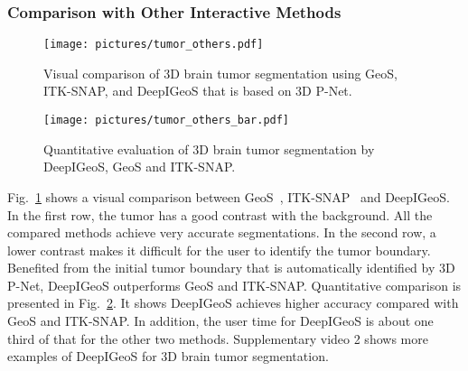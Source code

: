 \documentclass[10pt,journal,compsoc]{IEEEtran}
\begin{document}
\subsubsection{Comparison with Other Interactive Methods}
\begin{figure}[t]
	\centering
	\texttt{[image: pictures/tumor\_others.pdf]}
	\caption[Visual comparison of 3D brain tumor segmentation]{ 
		Visual comparison of 3D brain tumor segmentation using GeoS, ITK-SNAP, and DeepIGeoS that is based on 3D P-Net.} 
	\label{fig:tumor_others}
\end{figure}
\begin{figure}[t]
	\centering
	\texttt{[image: pictures/tumor\_others\_bar.pdf]}
	\caption[Quantitative evaluation of 3D brain tumor segmentation by DeepIGeoS, GeoS and ITK-SNAP.]{ 
		Quantitative evaluation of 3D brain tumor segmentation by DeepIGeoS, GeoS and ITK-SNAP.} 
	\label{fig:tumor_others_bar}
\end{figure}
\begin{comment}
\begin{table}
	\centering
	\small
	\caption{Quantitative evaluation of 3D brain tumor segmentation by DeepIGeoS and other interactive methods.}
	\label{tab:tumor_compare_other_methods}
	\begin{tabular}{llll}
		\hline
		Method & Dice(\%) & \pbox{20cm}{ASSD \\ (pixels)} & \pbox{20cm}{User time \\ (minutes)}  \\ \hline
		ITK-SNAP~\cite{Yushkevich2006} & 87.78$\pm$7.93 & 1.85$\pm$1.32 & 3.29$\pm$1.53 \\
		GeoS~\cite{Criminisi2008}      & 86.90$\pm$8.59 & 2.03$\pm$1.58 & 3.88$\pm$2.14 \\ 
		DeepIGeoS & 90.08$\pm$6.42  & 1.40$\pm$1.07 & 1.16$\pm$0.55\\
		\hline
	\end{tabular}
\end{table}
\end{comment}
Fig.~\ref{fig:tumor_others} shows a visual comparison between GeoS~\cite{Criminisi2008}, ITK-SNAP~\cite{Yushkevich2006} and DeepIGeoS. In the first row, the tumor has a good contrast with the background. All the compared methods achieve very accurate segmentations. In the second row, a lower contrast makes it difficult for the user to identify the tumor boundary. Benefited from the initial tumor boundary that is automatically identified by 3D P-Net, DeepIGeoS outperforms GeoS and ITK-SNAP. Quantitative comparison is presented in Fig.~\ref{fig:tumor_others_bar}. It shows DeepIGeoS achieves higher accuracy compared with GeoS and ITK-SNAP. In addition, the user time for DeepIGeoS is about one third of that for the other two methods. Supplementary video 2 shows more examples of DeepIGeoS for 3D brain tumor segmentation. 
\end{document}
